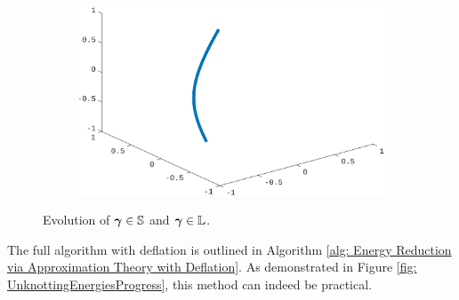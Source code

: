 \documentclass[../dissertation.tex]{subfiles}
\begin{document}
\begin{figure}[tbp]
\begin{subfigure}[b]{0.5\textwidth}
    \end{subfigure}
    \begin{subfigure}[b]{0.45\textwidth}
        \centering
        \includegraphics[width=\textwidth]{sections/FourierSeriesImgs/Chebyshev2}
    \end{subfigure}
    \caption{Evolution of $\boldsymbol{\gamma} \in \mathbb{S}$ and $\boldsymbol{\gamma} \in \mathbb{L}$.}
\end{figure}
The full algorithm with deflation is outlined in Algorithm \ref{alg: Energy Reduction via Approximation Theory with Deflation}.
As demonstrated in Figure \ref{fig: UnknottingEnergiesProgress},
this method can indeed be practical.
\end{document}
